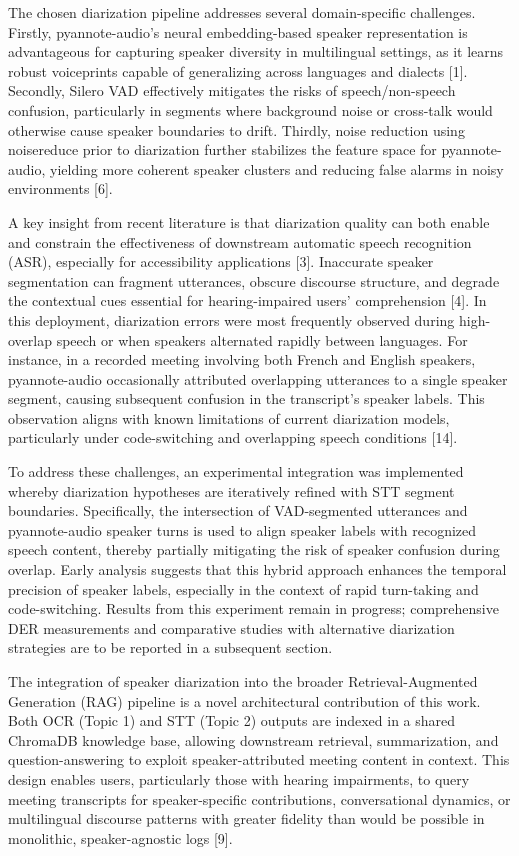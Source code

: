 \documentclass[12pt,a4paper]{article}
\begin{document}
The chosen diarization pipeline addresses several domain-specific challenges. Firstly, pyannote-audio’s neural embedding-based speaker representation is advantageous for capturing speaker diversity in multilingual settings, as it learns robust voiceprints capable of generalizing across languages and dialects [1]. Secondly, Silero VAD effectively mitigates the risks of speech/non-speech confusion, particularly in segments where background noise or cross-talk would otherwise cause speaker boundaries to drift. Thirdly, noise reduction using noisereduce prior to diarization further stabilizes the feature space for pyannote-audio, yielding more coherent speaker clusters and reducing false alarms in noisy environments [6].


A key insight from recent literature is that diarization quality can both enable and constrain the effectiveness of downstream automatic speech recognition (ASR), especially for accessibility applications [3]. Inaccurate speaker segmentation can fragment utterances, obscure discourse structure, and degrade the contextual cues essential for hearing-impaired users’ comprehension [4]. In this deployment, diarization errors were most frequently observed during high-overlap speech or when speakers alternated rapidly between languages. For instance, in a recorded meeting involving both French and English speakers, pyannote-audio occasionally attributed overlapping utterances to a single speaker segment, causing subsequent confusion in the transcript’s speaker labels. This observation aligns with known limitations of current diarization models, particularly under code-switching and overlapping speech conditions [14].


To address these challenges, an experimental integration was implemented whereby diarization hypotheses are iteratively refined with STT segment boundaries. Specifically, the intersection of VAD-segmented utterances and pyannote-audio speaker turns is used to align speaker labels with recognized speech content, thereby partially mitigating the risk of speaker confusion during overlap. Early analysis suggests that this hybrid approach enhances the temporal precision of speaker labels, especially in the context of rapid turn-taking and code-switching. Results from this experiment remain in progress; comprehensive DER measurements and comparative studies with alternative diarization strategies are to be reported in a subsequent section.


The integration of speaker diarization into the broader Retrieval-Augmented Generation (RAG) pipeline is a novel architectural contribution of this work. Both OCR (Topic 1) and STT (Topic 2) outputs are indexed in a shared ChromaDB knowledge base, allowing downstream retrieval, summarization, and question-answering to exploit speaker-attributed meeting content in context. This design enables users, particularly those with hearing impairments, to query meeting transcripts for speaker-specific contributions, conversational dynamics, or multilingual discourse patterns with greater fidelity than would be possible in monolithic, speaker-agnostic logs [9].
\end{document}
